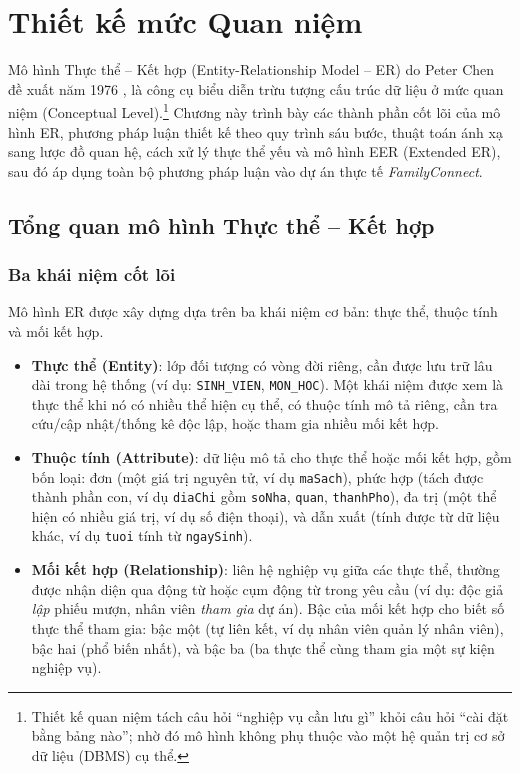 \chapter{Thiết kế mức Quan niệm}
\label{chap:quan_niem}

Mô hình Thực thể -- Kết hợp (Entity-Relationship Model -- ER) do Peter Chen đề xuất năm 1976 \cite{chen1976}, là công cụ biểu diễn trừu tượng cấu trúc dữ liệu ở mức quan niệm (Conceptual Level).\footnote{Thiết kế quan niệm tách câu hỏi ``nghiệp vụ cần lưu gì'' khỏi câu hỏi ``cài đặt bằng bảng nào''; nhờ đó mô hình không phụ thuộc vào một hệ quản trị cơ sở dữ liệu (DBMS) cụ thể.} Chương này trình bày các thành phần cốt lõi của mô hình ER, phương pháp luận thiết kế theo quy trình sáu bước, thuật toán ánh xạ sang lược đồ quan hệ, cách xử lý thực thể yếu và mô hình EER (Extended ER), sau đó áp dụng toàn bộ phương pháp luận vào dự án thực tế \textit{FamilyConnect}.

\section{Tổng quan mô hình Thực thể -- Kết hợp}
\label{sec:tongquan_er}

\subsection{Ba khái niệm cốt lõi}
Mô hình ER được xây dựng dựa trên ba khái niệm cơ bản: thực thể, thuộc tính và mối kết hợp.

\begin{itemize}
    \item \textbf{Thực thể (Entity)}: lớp đối tượng có vòng đời riêng, cần được lưu trữ lâu dài trong hệ thống (ví dụ: \texttt{SINH\_VIEN}, \texttt{MON\_HOC}). Một khái niệm được xem là thực thể khi nó có nhiều thể hiện cụ thể, có thuộc tính mô tả riêng, cần tra cứu/cập nhật/thống kê độc lập, hoặc tham gia nhiều mối kết hợp.
    \item \textbf{Thuộc tính (Attribute)}: dữ liệu mô tả cho thực thể hoặc mối kết hợp, gồm bốn loại: đơn (một giá trị nguyên tử, ví dụ \texttt{maSach}), phức hợp (tách được thành phần con, ví dụ \texttt{diaChi} gồm \texttt{soNha}, \texttt{quan}, \texttt{thanhPho}), đa trị (một thể hiện có nhiều giá trị, ví dụ số điện thoại), và dẫn xuất (tính được từ dữ liệu khác, ví dụ \texttt{tuoi} tính từ \texttt{ngaySinh}).
    \item \textbf{Mối kết hợp (Relationship)}: liên hệ nghiệp vụ giữa các thực thể, thường được nhận diện qua động từ hoặc cụm động từ trong yêu cầu (ví dụ: độc giả \emph{lập} phiếu mượn, nhân viên \emph{tham gia} dự án). Bậc của mối kết hợp cho biết số thực thể tham gia: bậc một (tự liên kết, ví dụ nhân viên quản lý nhân viên), bậc hai (phổ biến nhất), và bậc ba (ba thực thể cùng tham gia một sự kiện nghiệp vụ).
\end{itemize}

